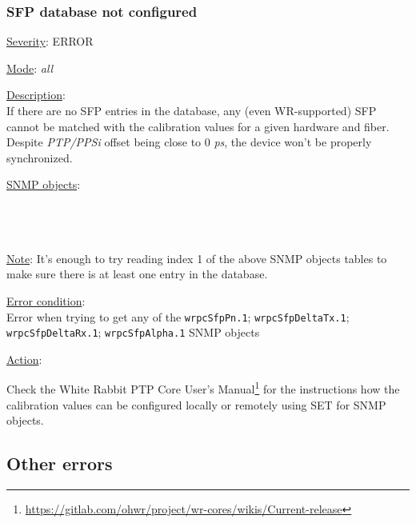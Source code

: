 \subsubsection{\bf SFP database not configured}
		\label{fail:timing:no_sfpdb}
		\begin{pck_descr}
			\item [] \underline{Severity}: ERROR
			\item [] \underline{Mode}: \emph{all}
			\item [] \underline{Description}:\\
				If there are no SFP entries in the database, any (even WR-supported) SFP
				cannot be matched with the calibration values for a given hardware and
				fiber. Despite \emph{PTP/PPSi} offset being close to 0 \emph{ps}, the
				device won't be properly synchronized.
			\item [] \underline{SNMP objects}:\\
				{\footnotesize
				\\
				\\
				\\
				 }
			\item [] \underline{Note}: It's enough to try reading index 1 of the above
				SNMP objects tables to make sure there is at least one entry in the
				database.
			\item [] \underline{Error condition}:\\
				{\footnotesize
        Error when trying to get any of the \texttt{wrpcSfpPn.1};
        \texttt{wrpcSfpDeltaTx.1}; \texttt{wrpcSfpDeltaRx.1};
        \texttt{wrpcSfpAlpha.1} SNMP objects}
      \item [] \underline{Action}:
        \begin{pck_proc}
        \item Check the White Rabbit PTP Core User's
          Manual\footnote{\url{https://gitlab.com/ohwr/project/wr-cores/wikis/Current-release}}
          for the instructions how the calibration values can be configured
          locally or remotely using SET for SNMP objects.
        \end{pck_proc}
		\end{pck_descr}

\newpage
\subsection{Other errors}
\label{sec:other_fail}

